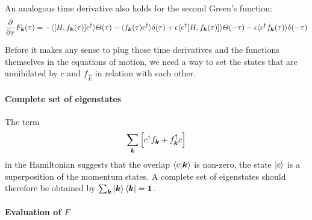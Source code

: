 \documentclass[11pt, english, fleqn, DIV=15, headinclude, BCOR=1cm]{scrartcl}
\begin{document}
An analogous time derivative also holds for the second Green's function:
\[
    \pd{}\tau F_{\vec k}(\tau)
    =
    - \bracket{[H, f_{\vec k}(\tau)] c^\dagger } \Theta(\tau)
    - \bracket{f_{\vec k}(\tau) c^\dagger } \delta(\tau)
    + \epsilon \bracket{c^\dagger [H, f_{\vec k}(\tau)]} \Theta(-\tau)
    - \epsilon \bracket{c^\dagger f_{\vec k}(\tau)} \delta(-\tau)
\]

Before it makes any sense to plug those time derivatives and the functions
themselves in the equations of motion, we need a way to set the states that are
annihilated by $c$ and $f_{\vec k}$ in relation with each other.

\paragraph{Complete set of eigenstates}

The term
\[
    \sum_{\vec k} \sbr{c^\dagger f_{\vec k} + f_{\vec k}^\dagger c}
\]
in the Hamiltonian suggests that the overlap $\braket{c | \vec k}$ is non-zero,
the state $\ket c$ is a superposition of the momentum states. A complete set of
eigenstates should therefore be obtained by $\sum_{\vec k} \ket{\vec k}
\bra{\vec k} = \mat 1$.

\paragraph{Evaluation of $F$}
\end{document}
